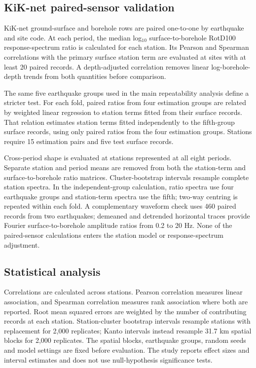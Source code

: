 \documentclass[11pt]{article}
\begin{document}
\subsection{KiK-net paired-sensor validation}

KiK-net ground-surface and borehole rows are paired one-to-one by earthquake and site code. At each period, the median log$_{10}$ surface-to-borehole RotD100 response-spectrum ratio is calculated for each station. Its Pearson and Spearman correlations with the primary surface station term are evaluated at sites with at least 20 paired records. A depth-adjusted correlation removes linear log-borehole-depth trends from both quantities before comparison.

The same five earthquake groups used in the main repeatability analysis define a stricter test. For each fold, paired ratios from four estimation groups are related by weighted linear regression to station terms fitted from their surface records. That relation estimates station terms fitted independently to the fifth-group surface records, using only paired ratios from the four estimation groups. Stations require 15 estimation pairs and five test surface records.

Cross-period shape is evaluated at stations represented at all eight periods. Separate station and period means are removed from both the station-term and surface-to-borehole ratio matrices. Cluster-bootstrap intervals resample complete station spectra. In the independent-group calculation, ratio spectra use four earthquake groups and station-term spectra use the fifth; two-way centring is repeated within each fold. A complementary waveform check uses 460 paired records from two earthquakes; demeaned and detrended horizontal traces provide Fourier surface-to-borehole amplitude ratios from 0.2 to 20 Hz. None of the paired-sensor calculations enters the station model or response-spectrum adjustment.

\subsection{Statistical analysis}

Correlations are calculated across stations. Pearson correlation measures linear association, and Spearman correlation measures rank association where both are reported. Root mean squared errors are weighted by the number of contributing records at each station. Station-cluster bootstrap intervals resample stations with replacement for 2,000 replicates; Kanto intervals instead resample 31.7 km spatial blocks for 2,000 replicates. The spatial blocks, earthquake groups, random seeds and model settings are fixed before evaluation. The study reports effect sizes and interval estimates and does not use null-hypothesis significance tests.
\end{document}
